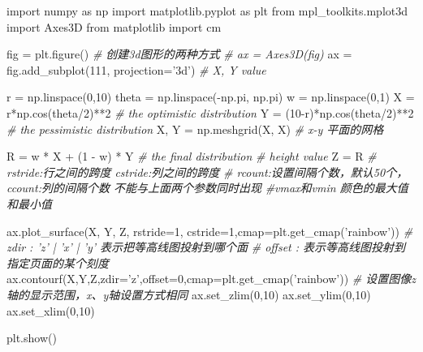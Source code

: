 \documentclass[11pt]{article}
\newenvironment{Shaded}{}{}
\newcommand{\DecValTok}[1]{\textcolor[rgb]{0.25,0.63,0.44}{{#1}}}
\newcommand{\StringTok}[1]{\textcolor[rgb]{0.25,0.44,0.63}{{#1}}}
\newcommand{\CommentTok}[1]{\textcolor[rgb]{0.38,0.63,0.69}{\textit{{#1}}}}
\newcommand{\NormalTok}[1]{{#1}}
\newcommand{\ImportTok}[1]{{#1}}
\newcommand{\OperatorTok}[1]{\textcolor[rgb]{0.40,0.40,0.40}{{#1}}}
\begin{document}
\begin{Shaded}
\begin{Highlighting}[]
\ImportTok{import}\NormalTok{ numpy }\ImportTok{as}\NormalTok{ np  }
\ImportTok{import}\NormalTok{ matplotlib.pyplot }\ImportTok{as}\NormalTok{ plt  }
\ImportTok{from}\NormalTok{ mpl_toolkits.mplot3d }\ImportTok{import}\NormalTok{ Axes3D }
\ImportTok{from}\NormalTok{ matplotlib }\ImportTok{import}\NormalTok{ cm}

\NormalTok{fig }\OperatorTok{=}\NormalTok{ plt.figure()  }
\CommentTok{# 创建3d图形的两种方式  }
\CommentTok{# ax = Axes3D(fig)  }
\NormalTok{ax }\OperatorTok{=}\NormalTok{ fig.add_subplot(}\DecValTok{111}\NormalTok{, projection}\OperatorTok{=}\StringTok{'3d'}\NormalTok{)  }
\CommentTok{# X, Y value}

\NormalTok{r }\OperatorTok{=}\NormalTok{ np.linspace(}\DecValTok{0}\NormalTok{,}\DecValTok{10}\NormalTok{)}
\NormalTok{theta }\OperatorTok{=}\NormalTok{ np.linspace(}\OperatorTok{-}\NormalTok{np.pi, np.pi) }
\NormalTok{w }\OperatorTok{=}\NormalTok{ np.linspace(}\DecValTok{0}\NormalTok{,}\DecValTok{1}\NormalTok{)}
\NormalTok{X }\OperatorTok{=}\NormalTok{ r}\OperatorTok{*}\NormalTok{np.cos(theta}\OperatorTok{/}\DecValTok{2}\NormalTok{)}\OperatorTok{**}\DecValTok{2}  \CommentTok{# the optimistic distribution}
\NormalTok{Y }\OperatorTok{=}\NormalTok{ (}\DecValTok{10}\OperatorTok{-}\NormalTok{r)}\OperatorTok{*}\NormalTok{np.cos(theta}\OperatorTok{/}\DecValTok{2}\NormalTok{)}\OperatorTok{**}\DecValTok{2} \CommentTok{# the pessimistic distribution}
\NormalTok{X, Y }\OperatorTok{=}\NormalTok{ np.meshgrid(X, X)    }\CommentTok{# x-y 平面的网格 }

\NormalTok{R }\OperatorTok{=}\NormalTok{ w }\OperatorTok{*}\NormalTok{ X }\OperatorTok{+}\NormalTok{ (}\DecValTok{1} \OperatorTok{-}\NormalTok{ w) }\OperatorTok{*}\NormalTok{ Y }\CommentTok{# the final distribution}
\CommentTok{# height value  }
\NormalTok{Z }\OperatorTok{=}\NormalTok{ R}
\CommentTok{# rstride:行之间的跨度  cstride:列之间的跨度  }
\CommentTok{# rcount:设置间隔个数，默认50个，ccount:列的间隔个数  不能与上面两个参数同时出现  }
\CommentTok{#vmax和vmin  颜色的最大值和最小值  }


\NormalTok{ax.plot_surface(X, Y, Z, rstride}\OperatorTok{=}\DecValTok{1}\NormalTok{, cstride}\OperatorTok{=}\DecValTok{1}\NormalTok{,cmap}\OperatorTok{=}\NormalTok{plt.get_cmap(}\StringTok{'rainbow'}\NormalTok{)) }
\CommentTok{# zdir : 'z' | 'x' | 'y' 表示把等高线图投射到哪个面  }
\CommentTok{# offset : 表示等高线图投射到指定页面的某个刻度  }
\NormalTok{ax.contourf(X,Y,Z,zdir}\OperatorTok{=}\StringTok{'z'}\NormalTok{,offset}\OperatorTok{=}\DecValTok{0}\NormalTok{,cmap}\OperatorTok{=}\NormalTok{plt.get_cmap(}\StringTok{'rainbow'}\NormalTok{))  }
\CommentTok{# 设置图像z轴的显示范围，x、y轴设置方式相同  }
\NormalTok{ax.set_zlim(}\DecValTok{0}\NormalTok{,}\DecValTok{10}\NormalTok{) }
\NormalTok{ax.set_ylim(}\DecValTok{0}\NormalTok{,}\DecValTok{10}\NormalTok{) }
\NormalTok{ax.set_xlim(}\DecValTok{0}\NormalTok{,}\DecValTok{10}\NormalTok{)}

\NormalTok{plt.show()}
\end{Highlighting}
\end{Shaded}

    
    
    

    
    
    
\end{document}
